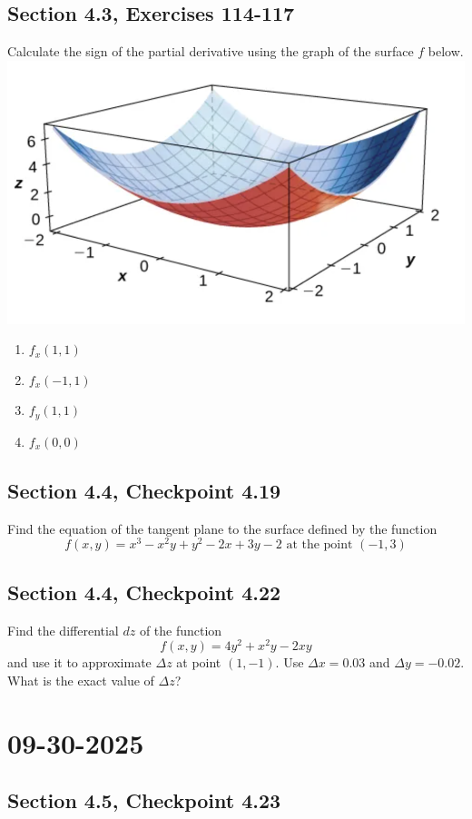 \documentclass[]{mangos-musings}
\begin{document}
\subsection{Section 4.3, Exercises 114-117}
Calculate the sign of the partial derivative using the graph of the surface $f$ below.
\\\includegraphics[scale=0.4]{assets/rec10-ex114-117.png}
\begin{enumerate}[start=114]
  \item $f_x(1, 1)$
  \item $f_x(-1, 1)$
  \item $f_y(1, 1)$
  \item $f_x(0, 0)$
\end{enumerate}
\subsection{Section 4.4, Checkpoint 4.19}
Find the equation of the tangent plane to the surface defined by the function 
\[f(x, y) = x^3 - x^2 y + y^2 - 2x + 3y - 2 \text{ at the point }(-1, 3)\]

\newpage
\subsection{Section 4.4, Checkpoint 4.22}
Find the differential $dz$ of the function 
\[f(x, y) = 4y^2 + x^2 y - 2xy\]
and use it to approximate $\Delta z$ at point $(1, -1)$. Use $\Delta x = 0.03$ and $\Delta y = -0.02$.
What is the exact value of $\Delta z$?


\newpage
\section{09-30-2025}
\subsection{Section 4.5, Checkpoint 4.23}
\end{document}
